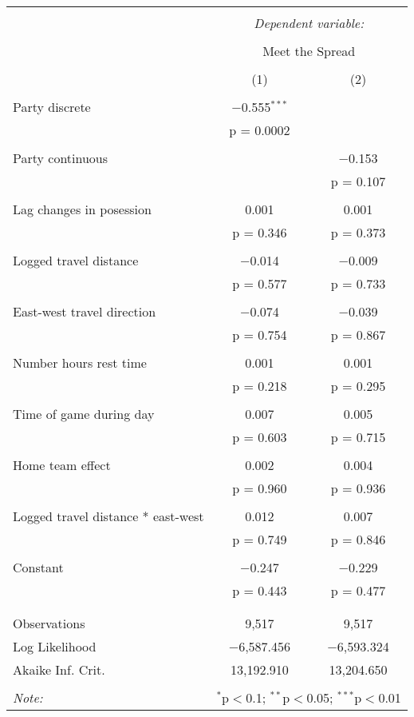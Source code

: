 \documentclass[letterpaper,12pt]{article}
\begin{document}
\begin{tabular}{@{\extracolsep{5pt}}lcc}  \\[-1.8ex]\hline  \hline \\[-1.8ex]   & \multicolumn{2}{c}{\textit{Dependent variable:}} \\  \cline{2-3}  \\[-1.8ex] & \multicolumn{2}{c}{Meet the Spread} \\  \\[-1.8ex] & (1) & (2)\\  \hline \\[-1.8ex]   Party discrete & $-$0.555$^{***}$ &  \\    & p = 0.0002 &  \\    & & \\   Party continuous &  & $-$0.153 \\    &  & p = 0.107 \\    & & \\   Lag changes in posession & 0.001 & 0.001 \\    & p = 0.346 & p = 0.373 \\    & & \\   Logged travel distance & $-$0.014 & $-$0.009 \\    & p = 0.577 & p = 0.733 \\    & & \\   East-west travel direction & $-$0.074 & $-$0.039 \\    & p = 0.754 & p = 0.867 \\    & & \\   Number hours rest time & 0.001 & 0.001 \\    & p = 0.218 & p = 0.295 \\    & & \\   Time of game during day & 0.007 & 0.005 \\    & p = 0.603 & p = 0.715 \\    & & \\   Home team effect & 0.002 & 0.004 \\    & p = 0.960 & p = 0.936 \\    & & \\   Logged travel distance * east-west & 0.012 & 0.007 \\    & p = 0.749 & p = 0.846 \\    & & \\   Constant & $-$0.247 & $-$0.229 \\    & p = 0.443 & p = 0.477 \\    & & \\  \hline \\[-1.8ex]  Observations & 9,517 & 9,517 \\  Log Likelihood & $-$6,587.456 & $-$6,593.324 \\  Akaike Inf. Crit. & 13,192.910 & 13,204.650 \\  \hline  \hline \\[-1.8ex]  \textit{Note:}  & \multicolumn{2}{r}{$^{*}$p$<$0.1; $^{**}$p$<$0.05; $^{***}$p$<$0.01} \\  \end{tabular}  
\end{document}
